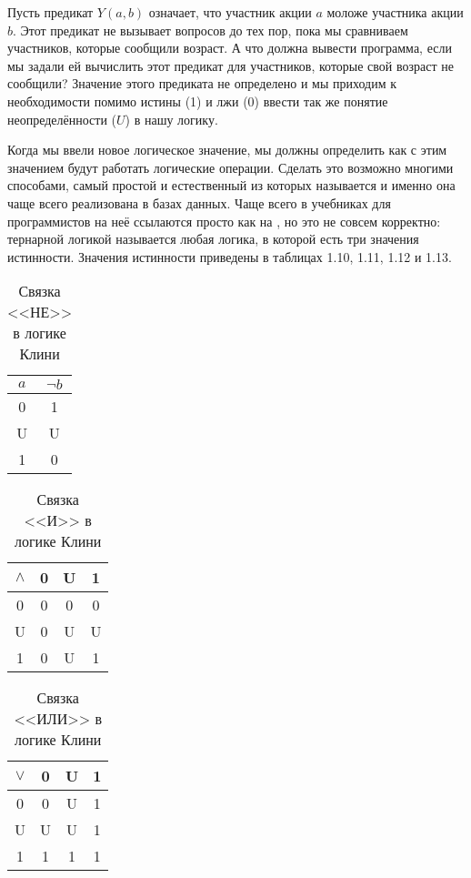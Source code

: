 Пусть предикат $Y(a, b)$ означает, что участник акции $a$ моложе участника акции $b$. Этот предикат не вызывает вопросов до тех пор, пока мы сравниваем участников, которые сообщили возраст. А что должна вывести программа, если мы задали ей вычислить этот предикат для участников, которые свой возраст не сообщили? Значение этого предиката не определено и мы приходим к необходимости помимо истины (1) и лжи (0) ввести так же понятие неопределённости ($U$) в нашу логику.

Когда мы ввели новое логическое значение, мы должны определить как с этим значением будут работать логические операции. Сделать это возможно многими способами, самый простой и естественный из которых называется  и именно она чаще всего реализована в базах данных. Чаще всего в учебниках для программистов на неё ссылаются просто как на , но это не совсем корректно: тернарной логикой называется любая логика, в которой есть три значения истинности. Значения истинности приведены в таблицах 1.10, 1.11, 1.12 и 1.13.

\begin{table}[h]
\centering
\begin{tabular}{c | c}
$a$ & $\neg b$ \\
\hline
0 & 1 \\
U & U\\
1 & 0
\end{tabular}
\caption{Связка <<НЕ>> в логике Клини}\label{table:kleene-not}
\end{table}

\begin{table}[h]
\centering
\begin{tabular}{c | c c c}
$\land$ & 0 &U &1 \\
\hline
0 & 0 & 0 & 0 \\
U & 0 & U & U\\
1 & 0 & U & 1
\end{tabular}
\caption{Связка <<И>> в логике Клини}\label{table:kleene-and}
\end{table}

\begin{table}[h]
\centering
\begin{tabular}{c | c c c}
$\lor$ & 0 &U &1 \\
\hline
0 & 0 & U & 1 \\
U & U & U & 1\\
1 & 1 & 1 & 1
\end{tabular}
\caption{Связка <<ИЛИ>> в логике Клини}\label{table:kleene-or}
\end{table}

